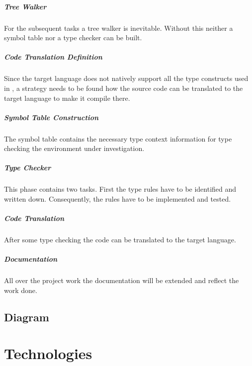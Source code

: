 \paragraph{Tree Walker}
For the subsequent tasks a tree walker is inevitable. Without this
neither a symbol table nor a type checker can be built.

\paragraph{Code Translation Definition}
Since the target language does not natively support all the type
constructs used in \ooplss, a strategy needs to be found
how the source code can be translated to the target language to make it
compile there.

\paragraph{Symbol Table Construction}
The symbol table contains the necessary type context information for
type checking the environment under investigation.

\paragraph{Type Checker}
This phase contains two tasks. First the type rules have to be identified
and written down. Consequently, the rules have to be implemented and tested.

\paragraph{Code Translation}
After some type checking the code can be translated to the target language.

\paragraph{Documentation}
All over the project work the documentation will be extended and reflect the work done.

\section{Diagram}
\begin{sideways}
	\centering
	
\end{sideways}

\chapter{Technologies}

